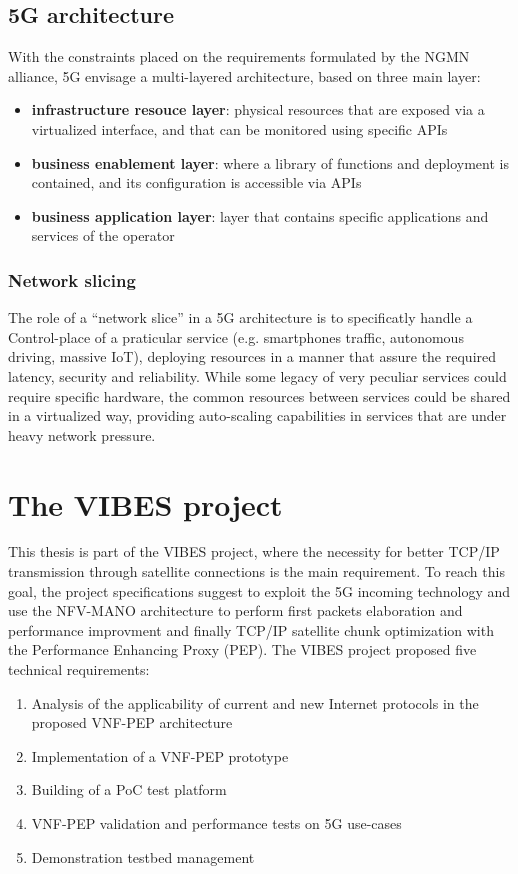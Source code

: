 \documentclass[10pt]{book}
\begin{document}
\subsection{5G architecture}

With the constraints placed on the requirements formulated by the NGMN alliance,
5G envisage a multi-layered architecture, based on three main layer:
\begin{itemize}
\item \textbf{infrastructure resouce layer}: physical resources that are exposed
  via a virtualized interface, and that can be monitored using specific APIs
\item \textbf{business enablement layer}: where a library of functions and
  deployment is contained, and its configuration is accessible via APIs
\item \textbf{business application layer}: layer that contains specific
  applications and services of the operator
\end{itemize}

\subsubsection{Network slicing}
The role of a ``network slice'' in a 5G architecture is to specificatly handle a
Control-place of a praticular service (e.g. smartphones traffic, autonomous
driving, massive IoT), deploying resources in a manner that assure the required
latency, security and reliability. While some legacy of very peculiar services
could require specific hardware, the common resources between services could be
shared in a virtualized way, providing auto-scaling capabilities in services
that are under heavy network pressure.

\section{The VIBES project}
 
 This thesis is part of the VIBES project, where the necessity for better TCP/IP
 transmission through satellite connections is the main requirement. To reach
 this goal, the project specifications suggest to exploit the 5G incoming
 technology and use the NFV-MANO architecture to perform first packets
 elaboration and performance improvment and finally TCP/IP satellite chunk
 optimization with the Performance Enhancing Proxy (PEP). The VIBES project
 proposed five technical requirements:
\begin{enumerate}
 \item Analysis of the applicability of current and new Internet protocols in
   the proposed VNF-PEP architecture
 \item Implementation of a VNF-PEP prototype
 \item Building of a PoC test platform
 \item VNF-PEP validation and performance tests on 5G use-cases
 \item Demonstration testbed management
\end{enumerate}
\end{document}
